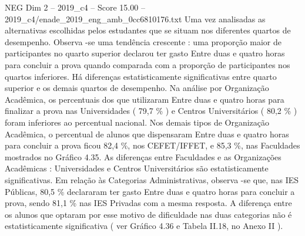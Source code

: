 \begin{textsample}{NEG Dim 2 – 2019\_c4 – Score 15.00 – 2019\_c4/enade\_2019\_eng\_amb\_0cc6810176.txt}
Uma vez analisadas as alternativas escolhidas pelos estudantes que se situam nos diferentes quartos de desempenho.
Observa -se uma tendência crescente : uma proporção maior de participantes no quarto superior declarou ter gasto Entre duas e quatro horas para concluir a prova quando comparada com a proporção de participantes nos quartos inferiores.
Há diferenças estatisticamente significativas entre quarto superior e os demais quartos de desempenho.
Na análise por Organização Acadêmica, os percentuais dos que utilizaram Entre duas e quatro horas para finalizar a prova nas Universidades ( 79,7 \% ) e Centros Universitários ( 80,2 \% ) foram inferiores ao percentual nacional.
Nos demais tipos de Organização Acadêmica, o percentual de alunos que dispensaram Entre duas e quatro horas para concluir a prova ficou 82,4 \%, nos CEFET/IFFET, e 85,3 \%, nas Faculdades mostrados no Gráfico 4.35.
As diferenças entre Faculdades e as Organizações Acadêmicas : Universidades e Centros Universitários são estatisticamente significativas.
Em relação às Categorias Administrativas, observa -se que, nas IES Públicas, 80,5 \% declararam ter gasto Entre duas e quatro horas para concluir a prova, sendo 81,1 \% nas IES Privadas com a mesma resposta.
A diferença entre os alunos que optaram por esse motivo de dificuldade nas duas categorias não é estatisticamente significativa ( ver Gráfico 4.36 e Tabela II.18, no Anexo II ).

\end{textsample}
